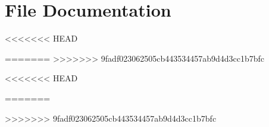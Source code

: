\documentclass[twoside]{book}
\newcommand{\+}{\discretionary{\mbox{\scriptsize$\hookleftarrow$}}{}{}}
\newcommand{\clearemptydoublepage}{%
  \newpage{\pagestyle{empty}\cleardoublepage}%
}
\begin{document}
\chapter{File Documentation}












<<<<<<< HEAD


=======
>>>>>>> 9fadf023062505cb443534457ab9d4d3cc1b7bfc










<<<<<<< HEAD










=======


>>>>>>> 9fadf023062505cb443534457ab9d4d3cc1b7bfc












\backmatter
\newpage
{}
\clearemptydoublepage
{}
\printindex
\end{document}
